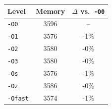 \begin{tabular*}{\columnwidth}{@{\extracolsep\fill}lcc@{\extracolsep\fill}}
\toprule
\textbf{Level} & \textbf{Memory} & \textbf{$\Delta$ vs.\ \texttt{-O0}} \\
\midrule
\texttt{-O0} & 3596 & -- \\
\texttt{-O1} & 3576 & -1\% \\
\texttt{-O2} & 3580 & -0\% \\
\texttt{-O3} & 3580 & -0\% \\
\texttt{-Os} & 3576 & -1\% \\
\texttt{-Oz} & 3586 & -0\% \\
\texttt{-Ofast} & 3574 & -1\% \\
\bottomrule
\end{tabular*}
